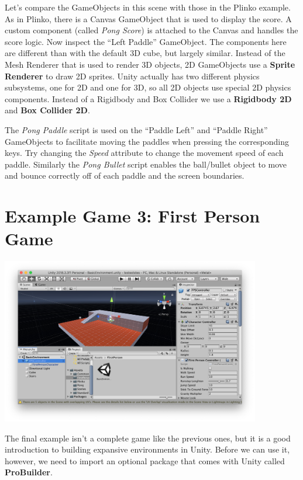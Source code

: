 \documentclass[11pt]{article}
\begin{document}
Let's compare the GameObjects in this scene with those in the Plinko example.  As in Plinko, there is a Canvas GameObject that is used to display the score.  A custom component (called \textit{Pong Score}) is attached to the Canvas and handles the score logic.  Now inspect the ``Left Paddle'' GameObject.  The components here are different than with the default 3D cube, but largely similar.  Instead of the Mesh Renderer that is used to render 3D objects, 2D GameObjects use a \textbf{Sprite Renderer} to draw 2D sprites.  Unity actually has two different physics subsystems, one for 2D and one for 3D, so all 2D objects use special 2D physics components.  Instead of a Rigidbody and Box Collider we use a \textbf{Rigidbody 2D} and \textbf{Box Collider 2D}.

The \textit{Pong Paddle} script is used on the ``Paddle Left'' and ``Paddle Right'' GameObjects to facilitate moving the paddles when pressing the corresponding keys.  Try changing the \textit{Speed} attribute to change the movement speed of each paddle.  Similarly the \textit{Pong Bullet} script enables the ball/bullet object to move and bounce correctly off of each paddle and the screen boundaries.

\section{Example Game 3: First Person Game}

\begin{center}
\centering \noindent
\includegraphics[width=0.85\textwidth]{fpsgame}
\end{center}

The final example isn't a complete game like the previous ones, but it is a good introduction to building expansive environments in Unity.  Before we can use it, however, we need to import an optional package that comes with Unity called \textbf{ProBuilder}.
\end{document}
